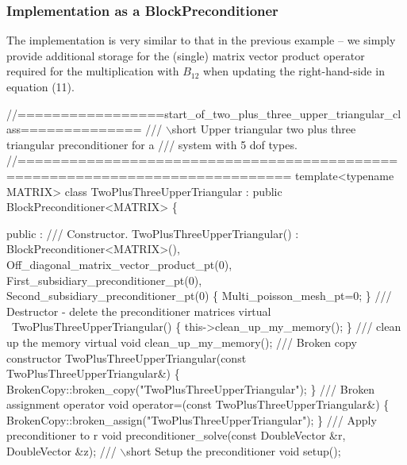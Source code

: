 \]\hypertarget{index_two_plus_three_upper_triangular_implementation}{}\subsubsection{Implementation as a Block\+Preconditioner}\label{index_two_plus_three_upper_triangular_implementation}
The implementation is very similar to that in the previous example -- we simply provide additional storage for the (single) matrix vector product operator required for the multiplication with $ B_{12} $ when updating the right-\/hand-\/side in equation (11).


\begin{DoxyCodeInclude}
\textcolor{comment}{//=================start\_of\_two\_plus\_three\_upper\_triangular\_class==============}\textcolor{comment}{}
\textcolor{comment}{/// \(\backslash\)short Upper triangular two plus three triangular preconditioner for a }
\textcolor{comment}{/// system with  5 dof types.}
\textcolor{comment}{}\textcolor{comment}{//=============================================================================}
 \textcolor{keyword}{template}<\textcolor{keyword}{typename} MATRIX> 
 \textcolor{keyword}{class }TwoPlusThreeUpperTriangular 
  : \textcolor{keyword}{public} BlockPreconditioner<MATRIX>
 \{
 
 public :
 \textcolor{comment}{}
\textcolor{comment}{  /// Constructor.}
\textcolor{comment}{}  TwoPlusThreeUpperTriangular()  :
   BlockPreconditioner<MATRIX>(),
    Off\_diagonal\_matrix\_vector\_product\_pt(0),
    First\_subsidiary\_preconditioner\_pt(0),
    Second\_subsidiary\_preconditioner\_pt(0)
   \{ 
    Multi\_poisson\_mesh\_pt=0;
   \}
 \textcolor{comment}{}
\textcolor{comment}{  /// Destructor - delete the preconditioner matrices}
\textcolor{comment}{}  \textcolor{keyword}{virtual} ~TwoPlusThreeUpperTriangular()
   \{
    this->clean\_up\_my\_memory();
   \}
\textcolor{comment}{}
\textcolor{comment}{  /// clean up the memory}
\textcolor{comment}{}  \textcolor{keyword}{virtual} \textcolor{keywordtype}{void} clean\_up\_my\_memory();
 \textcolor{comment}{}
\textcolor{comment}{  /// Broken copy constructor}
\textcolor{comment}{}  TwoPlusThreeUpperTriangular(\textcolor{keyword}{const} TwoPlusThreeUpperTriangular&) 
   \{ 
    BrokenCopy::broken\_copy(\textcolor{stringliteral}{"TwoPlusThreeUpperTriangular"});
   \} 
 \textcolor{comment}{}
\textcolor{comment}{  /// Broken assignment operator}
\textcolor{comment}{}  \textcolor{keywordtype}{void} operator=(\textcolor{keyword}{const} TwoPlusThreeUpperTriangular&) 
   \{
    BrokenCopy::broken\_assign(\textcolor{stringliteral}{"TwoPlusThreeUpperTriangular"});
   \}
 \textcolor{comment}{}
\textcolor{comment}{  /// Apply preconditioner to r}
\textcolor{comment}{}  \textcolor{keywordtype}{void} preconditioner\_solve(\textcolor{keyword}{const} DoubleVector &r, DoubleVector &z);
 \textcolor{comment}{}
\textcolor{comment}{  /// \(\backslash\)short Setup the preconditioner }
\textcolor{comment}{}  \textcolor{keywordtype}{void} setup();
  

\end{DoxyCodeInclude}
